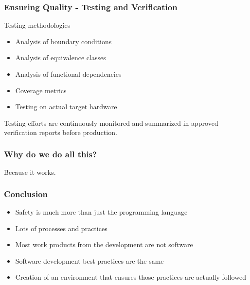 \documentclass[aspectratio=169]{beamer}
\newif\iftransitions
\newcommand{\cpause}{\iftransitions \pause \fi}
\begin{document}
\begin{frame}
  \frametitle{Ensuring Quality - Testing and Verification}
  
  Testing methodologies \cpause
  \begin{itemize}
    \item Analysis of boundary conditions \cpause
    \item Analysis of equivalence classes \cpause
    \item Analysis of functional dependencies \cpause
    \item Coverage metrics \cpause
    \item Testing on actual target hardware \cpause
  \end{itemize}
  
  Testing efforts are continuously monitored and summarized in approved verification reports before production.
\end{frame}

\begin{frame}
  \frametitle{Why do we do all this?}
  
   \cpause
  
  \begin{center}
    Because it works.
  \end{center}
\end{frame}

\begin{frame}
  \frametitle{Conclusion}
  
  \begin{itemize}
    \item Safety is much more than just the programming language
    \item Lots of processes and practices
    \item Most work products from the development are not software
    \item Software development best practices are the same
    \item Creation of an environment that ensures those practices are actually followed
  \end{itemize}
\end{frame}
\end{document}
